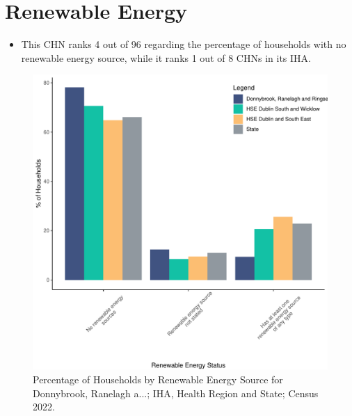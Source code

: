 \documentclass{article}
\begin{document}
\section{Renewable Energy}\label{sect:RE}
\begin{itemize}
\item This CHN ranks  4 out of 96 regarding the percentage of households with no renewable energy source, while it ranks   1 out of 8 CHNs in its IHA.
\end{itemize}
\begin{figure}[H]
	\centering
	\includegraphics[width = 140mm]{../figures/RenewableEnergyED.pdf}
	\caption{Percentage of Households by Renewable Energy Source for Donnybrook, Ranelagh a...; IHA, Health Region and State; Census 2022.}
	\label{fig:vbnv}
	\end{figure}
\end{document}
